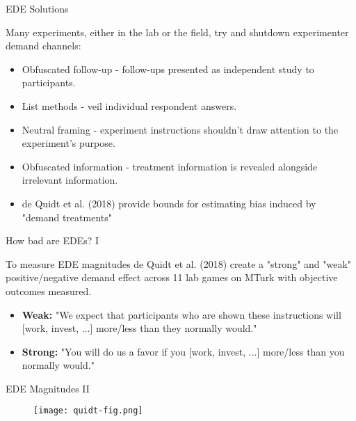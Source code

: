 \documentclass[aspectratio=169,xcolor=dvipsnames]{beamer}
\begin{document}
\begin{frame}{EDE Solutions}


Many experiments, either in the lab or the field, try and shutdown 
    experimenter demand channels:
\begin{itemize}
        \item Obfuscated follow-up - follow-ups presented as independent study to participants.
        \item List methods - veil individual respondent answers.
        \item Neutral framing - experiment instructions shouldn't draw attention to the experiment's purpose.
        \item Obfuscated information - treatment information is revealed alongside irrelevant information.
        \item de Quidt et al. (2018) provide bounds for estimating bias induced by "demand 
    treatments" 
\end{itemize}

\end{frame}



\begin{frame}{How bad are EDEs? I}

To measure EDE magnitudes de Quidt et al. (2018) create a "strong" and "weak" positive/negative demand effect 
    across 11 lab games on MTurk with objective outcomes measured.

    \begin{itemize}
        \item \textbf{Weak:}  "We expect that participants who are shown these instructions will [work, invest, ...] more/less than they
        normally would."
        \item  \textbf{Strong:}  "You will do us a favor if you [work, invest, ...] more/less than
you normally would."
    \end{itemize}


\end{frame}



\begin{frame}[label=magnitudes]{EDE Magnitudes II}

    \begin{figure}[htbp]
        \centering
        \texttt{[image: quidt-fig.png]} 
    \end{figure}
    \hyperlink{res-table}{}
\end{frame}
\end{document}
